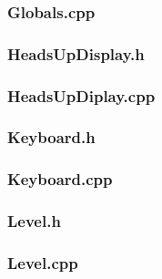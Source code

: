 \documentclass{article}
\begin{document}
\subsubsection{Globals.cpp}
	 
	 				
	 				
\subsubsection{HeadsUpDisplay.h}
	 
	 				
\subsubsection{HeadsUpDiplay.cpp}
	 		
	 				
\subsubsection{Keyboard.h}
	 
	 				
\subsubsection{Keyboard.cpp}
	 
	 				
\subsubsection{Level.h}
	 
	 				
\subsubsection{Level.cpp}
	 
	 				
\end{document}
